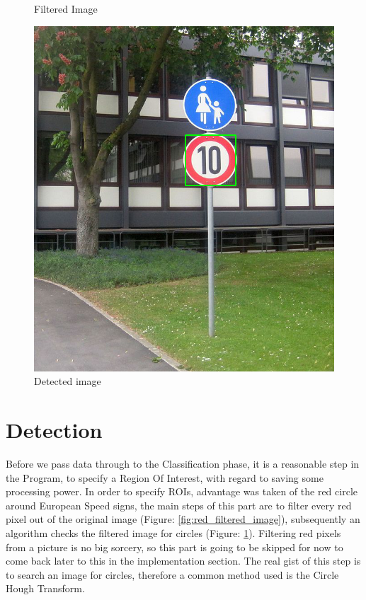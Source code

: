 \begin{figure}[H]
	\caption{Filtered Image}\label{fig:red_filtered_image}
	\endminipage\hfill
	\includegraphics[width=\linewidth]{images/detectedimg.png}
	\caption{Detected image}\label{fig:detected_image}
	\endminipage
\end{figure}

\section{Detection}
Before we pass data through to the Classification phase, it is a reasonable step in the Program, to specify a Region Of Interest, with regard to saving some processing power. In order to specify ROIs, advantage was taken of the red circle around European Speed signs, the main steps of this part are to filter every red pixel out of the original image (Figure: \ref{fig:red_filtered_image}), subsequently an algorithm checks the filtered image for circles (Figure: \ref{fig:detected_image}). Filtering red pixels from a picture is no big sorcery, so this part is going to be skipped for now to come back later to this in the implementation section. The real gist of this step is to search an image for circles, therefore a common method used is the Circle Hough Transform. 

